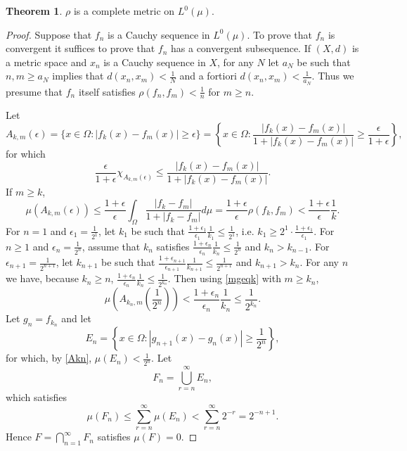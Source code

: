 \documentclass{article}
\theoremstyle{definition}
\newtheorem{theorem}{Theorem}
\theoremstyle{definition}
\begin{document}
\begin{theorem}
$\rho$ is a complete metric on $L^0(\mu)$.
\end{theorem}
\begin{proof}
Suppose that $f_n$ is a Cauchy
sequence in $L^0(\mu)$. 
To prove that $f_n$ is convergent it suffices to prove that
$f_n$ has a convergent subsequence. 
If $(X,d)$ is a metric space and $x_n$ is a Cauchy sequence in $X$, for any $N$ let 
$a_N$ be such that $n,m \geq a_N$ implies that $d(x_n,x_m)<\frac{1}{N}$ and a fortiori
$d(x_n,x_m)<\frac{1}{a_N}$. 
Thus we presume that $f_n$ itself satisfies $\rho(f_n,f_m)<\frac{1}{n}$ for $m \geq n$. 

Let
\[
A_{k,m}(\epsilon) = \{x \in \Omega: |f_k(x)-f_m(x)| \geq \epsilon\}
=\left\{ x\in \Omega:
\frac{|f_k(x)-f_m(x)|}{1+|f_k(x)-f_m(x)|} \geq \frac{\epsilon}{1+\epsilon}\right\},
\]
for which
\[
\frac{\epsilon}{1+\epsilon} \chi_{A_{k,m}(\epsilon)} \leq 
\frac{|f_k(x)-f_m(x)|}{1+|f_k(x)-f_m(x)|}.
\]
If $m \geq k$,
\begin{equation}
\mu(A_{k,m}(\epsilon)) 
\leq \frac{1+\epsilon}{\epsilon} \int_{\Omega}
\frac{|f_k-f_m|}{1+|f_k-f_m|} d\mu
=\frac{1+\epsilon}{\epsilon} \rho(f_k,f_m)
<\frac{1+\epsilon}{\epsilon} \frac{1}{k}.
\label{mgeqk}
\end{equation}
For $n=1$ and $\epsilon_1=\frac{1}{2^1}$, let $k_1$ be such that $\frac{1+\epsilon_1}{\epsilon_1} \frac{1}{k_1} \leq \frac{1}{2^1}$, i.e.
$k_1 \geq 2^1 \cdot \frac{1+\epsilon_1}{\epsilon_1}$. For $n \geq 1$ and $\epsilon_n=\frac{1}{2^n}$, assume that
$k_n$ satisfies $\frac{1+\epsilon_n}{\epsilon_n} \frac{1}{k_n} \leq \frac{1}{2^n}$ and $k_n>k_{n-1}$. 
For $\epsilon_{n+1}=\frac{1}{2^{n+1}}$, let $k_{n+1}$ be such that $\frac{1+\epsilon_{n+1}}{\epsilon_{n+1}} \frac{1}{k_{n+1}} \leq \frac{1}{2^{n+1}}$
and $k_{n+1}>k_n$. For any $n$ we have, because $k_n \geq n$,
$\frac{1+\epsilon_n}{\epsilon_n} \frac{1}{k_n} \leq  \frac{1}{2^{k_n}}$. Then using \eqref{mgeqk} with $m \geq k_n$,
\begin{equation}
\mu\left(A_{k_n,m}\left(\frac{1}{2^n}\right)\right) < \frac{1+\epsilon_n}{\epsilon_n} \frac{1}{k_n} \leq \frac{1}{2^{k_n}}. 
\label{Akn}
\end{equation}
Let $g_n=f_{k_n}$ and let
\[
E_n= \left\{ x \in \Omega: |g_{n+1}(x)-g_n(x)| \geq \frac{1}{2^n} \right\},
\]
for which, by \eqref{Akn}, $\mu(E_n)<\frac{1}{2^n}$. Let
\[
F_n=\bigcup_{r=n}^\infty E_n,
\]
which satisfies
\[
\mu(F_n) \leq \sum_{r=n}^\infty \mu(E_n) < \sum_{r=n}^\infty 2^{-r} = 2^{-n+1}.
\]
Hence $F=\bigcap_{n=1}^\infty F_n$ satisfies $\mu(F)=0$. 


\end{proof}
\end{document}
